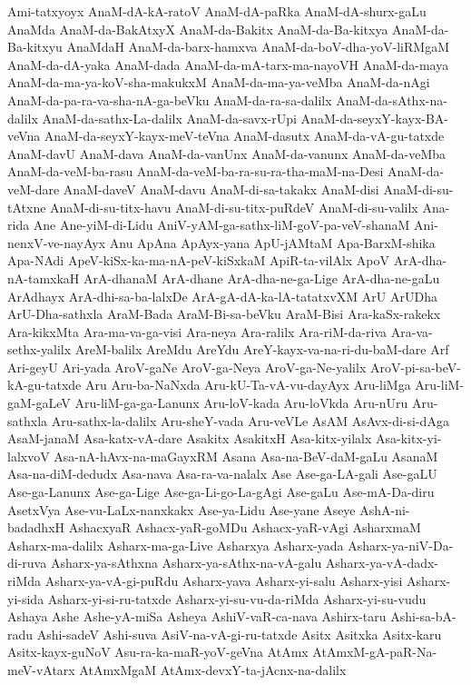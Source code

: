 {Ami-tatxyoyx
AnaM-dA-kA-ratoV
AnaM-dA-paRka
AnaM-dA-shurx-gaLu
AnaMda
AnaM-da-BakAtxyX
AnaM-da-Bakitx
AnaM-da-Ba-kitxya
AnaM-da-Ba-kitxyu
AnaMdaH
AnaM-da-barx-hamxva
AnaM-da-boV-dha-yoV-liRMgaM
AnaM-da-dA-yaka
AnaM-dada
AnaM-da-mA-tarx-ma-nayoVH
AnaM-da-maya
AnaM-da-ma-ya-koV-sha-makukxM
AnaM-da-ma-ya-veMba
AnaM-da-nAgi
AnaM-da-pa-ra-va-sha-nA-ga-beVku
AnaM-da-ra-sa-dalilx
AnaM-da-sAthx-na-dalilx
AnaM-da-sathx-La-dalilx
AnaM-da-savx-rUpi
AnaM-da-seyxY-kayx-BA-veVna
AnaM-da-seyxY-kayx-meV-teVna
AnaM-dasutx
AnaM-da-vA-gu-tatxde
AnaM-davU
AnaM-dava
AnaM-da-vanUnx
AnaM-da-vanunx
AnaM-da-veMba
AnaM-da-veM-ba-rasu
AnaM-da-veM-ba-ra-su-ra-tha-maM-na-Desi
AnaM-da-veM-dare
AnaM-daveV
AnaM-davu
AnaM-di-sa-takakx
AnaM-disi
AnaM-di-su-tAtxne
AnaM-di-su-titx-havu
AnaM-di-su-titx-puRdeV
AnaM-di-su-valilx
Ana-rida
Ane
Ane-yiM-di-Lidu
AniV-yAM-ga-sathx-liM-goV-pa-veV-shanaM
Ani-nenxV-ve-nayAyx
Anu
ApAna
ApAyx-yana
ApU-jAMtaM
Apa-BarxM-shika
Apa-NAdi
ApeV-kiSx-ka-ma-nA-peV-kiSxkaM
ApiR-ta-vilAlx
ApoV
ArA-dha-nA-tamxkaH
ArA-dhanaM
ArA-dhane
ArA-dha-ne-ga-Lige
ArA-dha-ne-gaLu
ArAdhayx
ArA-dhi-sa-ba-lalxDe
ArA-gA-dA-ka-lA-tatatxvXM
ArU
ArUDha
ArU-Dha-sathxla
AraM-Bada
AraM-Bi-sa-beVku
AraM-Bisi
Ara-kaSx-rakekx
Ara-kikxMta
Ara-ma-va-ga-visi
Ara-neya
Ara-ralilx
Ara-riM-da-riva
Ara-va-sethx-yalilx
AreM-balilx
AreMdu
AreYdu
AreY-kayx-va-na-ri-du-baM-dare
Arf
Ari-geyU
Ari-yada
AroV-gaNe
AroV-ga-Neya
AroV-ga-Ne-yalilx
AroV-pi-sa-beV-kA-gu-tatxde
Aru
Aru-ba-NaNxda
Aru-kU-Ta-vA-vu-dayAyx
Aru-liMga
Aru-liM-gaM-gaLeV
Aru-liM-ga-ga-Lanunx
Aru-loV-kada
Aru-loVkda
Aru-nUru
Aru-sathxla
Aru-sathx-la-dalilx
Aru-sheY-vada
Aru-veVLe
AsAM
AsAvx-di-si-dAga
AsaM-janaM
Asa-katx-vA-dare
Asakitx
AsakitxH
Asa-kitx-yilalx
Asa-kitx-yi-lalxvoV
Asa-nA-hAvx-na-maGayxRM
Asana
Asa-na-BeV-daM-gaLu
AsanaM
Asa-na-diM-dedudx
Asa-nava
Asa-ra-va-nalalx
Ase
Ase-ga-LA-gali
Ase-gaLU
Ase-ga-Lanunx
Ase-ga-Lige
Ase-ga-Li-go-La-gAgi
Ase-gaLu
Ase-mA-Da-diru
AsetxVya
Ase-vu-LaLx-nanxkakx
Ase-ya-Lidu
Ase-yane
Aseye
AshA-ni-badadhxH
AshacxyaR
Ashacx-yaR-goMDu
Ashacx-yaR-vAgi
AsharxmaM
Asharx-ma-dalilx
Asharx-ma-ga-Live
Asharxya
Asharx-yada
Asharx-ya-niV-Da-di-ruva
Asharx-ya-sAthxna
Asharx-ya-sAthx-na-vA-galu
Asharx-ya-vA-dadx-riMda
Asharx-ya-vA-gi-puRdu
Asharx-yava
Asharx-yi-salu
Asharx-yisi
Asharx-yi-sida
Asharx-yi-si-ru-tatxde
Asharx-yi-su-vu-da-riMda
Asharx-yi-su-vudu
Ashaya
Ashe
Ashe-yA-miSa
Asheya
AshiV-vaR-ca-nava
Ashirx-taru
Ashi-sa-bA-radu
Ashi-sadeV
Ashi-suva
AsiV-na-vA-gi-ru-tatxde
Asitx
Asitxka
Asitx-karu
Asitx-kayx-guNoV
Asu-ra-ka-maR-yoV-geVna
AtAmx
AtAmxM-gA-paR-Na-meV-vAtarx
AtAmxMgaM
AtAmx-devxY-ta-jAcnx-na-dalilx
}
